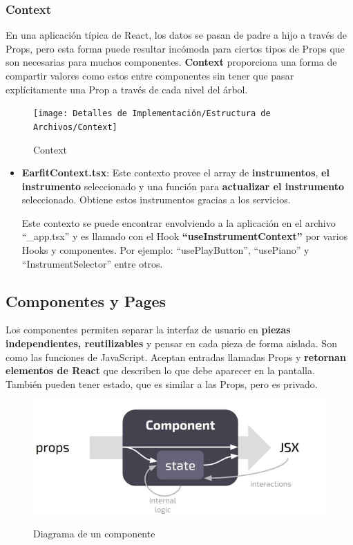 \documentclass[12pt,twoside,titlepage]{report}
\begin{document}
\subsubsection{Context}

En una aplicación típica de React, los datos se pasan de padre a hijo a través de Props, pero esta forma puede resultar incómoda para ciertos tipos de Props que son necesarias para muchos componentes. \textbf{Context} proporciona una forma de compartir valores como estos entre componentes sin tener que pasar explícitamente una Prop a través de cada nivel del árbol.

\begin{figure}[H]
    \centering
    \texttt{[image: Detalles de Implementación/Estructura de Archivos/Context]}
    \label{fig:Context}
    \caption{Context}
\end{figure}

\begin{itemize}
    \item \textbf{EarfitContext.tsx}: Este contexto provee el array de \textbf{instrumentos}, \textbf{el instrumento} seleccionado y una función para \textbf{actualizar el instrumento} seleccionado. Obtiene estos instrumentos gracias a los servicios.
        
    Este contexto se puede encontrar envolviendo a la aplicación en el archivo ``\_app.tsx'' y es llamado con el Hook \textbf{``useInstrumentContext''} por varios Hooks y componentes. Por ejemplo: ``usePlayButton'', ``usePiano'' y ``InstrumentSelector'' entre otros.
\end{itemize}

\subsection{Componentes y Pages}

Los componentes permiten separar la interfaz de usuario en \textbf{piezas independientes, reutilizables} y pensar en cada pieza de forma aislada. Son como las funciones de JavaScript. Aceptan entradas llamadas Props y \textbf{retornan elementos de React} que describen lo que debe aparecer en la pantalla. También pueden tener estado, que es similar a las Props, pero es privado.

\begin{figure}[H]
    \centering
    \includegraphics[scale=0.3]{React/ReactComponent}
    \label{fig:ReactComponent}
    \caption{Diagrama de un componente}
\end{figure}
\end{document}
